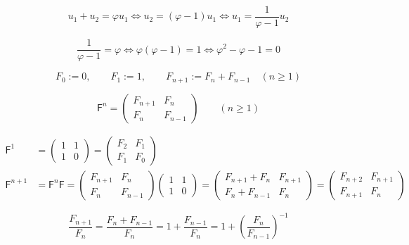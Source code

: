 \documentclass[12pt]{article}
\begin{document}
\begin{equation}
u_1+u_2=\varphi u_1
\Longleftrightarrow
u_2=(\varphi-1)u_1
\Longleftrightarrow
u_1=\frac{1}{\varphi-1}u_2
\end{equation}

\begin{equation}
\frac{1}{\varphi-1}=\varphi
\Longleftrightarrow
\varphi(\varphi-1)=1
\Longleftrightarrow
\varphi^2-\varphi-1=0
\end{equation}

\begin{equation}
F_0:=0,\qquad F_1:=1,\qquad F_{n+1}:=F_n+F_{n-1}\quad (n\ge 1)
\end{equation}

\begin{equation}
\mathsf{F}^n=
\begin{pmatrix}
F_{n+1}&F_n\\
F_n&F_{n-1}
\end{pmatrix}
\qquad (n\ge 1)
\end{equation}

\begin{align}
\mathsf{F}^1
&=
\begin{pmatrix}
1&1\\
1&0
\end{pmatrix}
=
\begin{pmatrix}
F_2&F_1\\
F_1&F_0
\end{pmatrix}
\\[4pt]
\mathsf{F}^{n+1}
&=
\mathsf{F}^n\mathsf{F}
=
\begin{pmatrix}
F_{n+1}&F_n\\
F_n&F_{n-1}
\end{pmatrix}
\begin{pmatrix}
1&1\\
1&0
\end{pmatrix}
=
\begin{pmatrix}
F_{n+1}+F_n&F_{n+1}\\
F_n+F_{n-1}&F_n
\end{pmatrix}
=
\begin{pmatrix}
F_{n+2}&F_{n+1}\\
F_{n+1}&F_n
\end{pmatrix}
\end{align}

\begin{equation}
\frac{F_{n+1}}{F_n}
=
\frac{F_n+F_{n-1}}{F_n}
=
1+\frac{F_{n-1}}{F_n}
=
1+\left(\frac{F_n}{F_{n-1}}\right)^{-1}
\end{equation}
\end{document}
